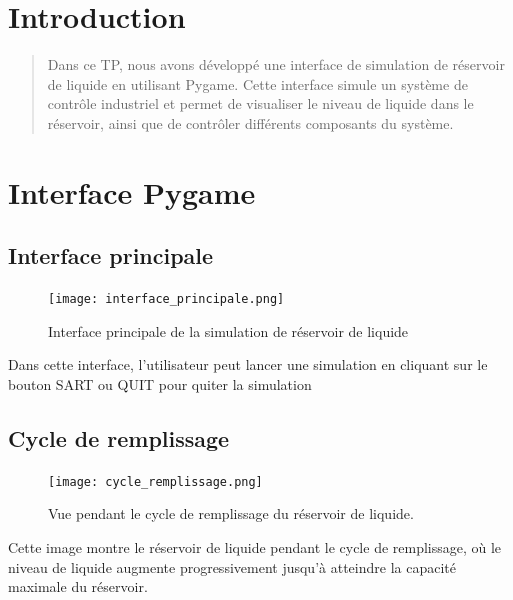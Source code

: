 \documentclass{article}
\begin{document}
\clearpage
\tableofcontents  %
\clearpage

\section{Introduction}
\begin{quote}
    Dans ce TP, nous avons développé une interface de simulation de réservoir de liquide en utilisant Pygame. Cette interface simule un système de contrôle industriel et permet de visualiser le niveau de liquide dans le réservoir, ainsi que de contrôler différents composants du système.
\end{quote}

\section{Interface Pygame}

\subsection{Interface principale}

\begin{figure}[H]
    \centering
    \texttt{[image: interface\_principale.png]}
    \caption{Interface principale de la simulation de réservoir de liquide}
    \label{fig:interface_principale}
\end{figure}

Dans cette interface, l'utilisateur peut lancer une simulation en cliquant sur le bouton SART ou QUIT pour quiter la simulation

\subsection{Cycle de remplissage}

\begin{figure}[H]
    \centering
    \texttt{[image: cycle\_remplissage.png]}

    \caption{Vue pendant le cycle de remplissage du réservoir de liquide.}
    \label{fig:cycle_remplissage}
\end{figure}

Cette image montre le réservoir de liquide pendant le cycle de remplissage, où le niveau de liquide augmente progressivement jusqu'à atteindre la capacité maximale du réservoir.
\end{document}
